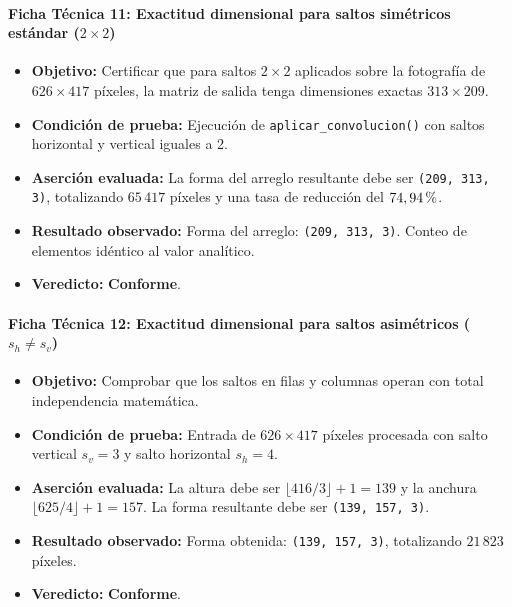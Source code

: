 \documentclass[11pt]{article}
\newcommand{\pct}{\ensuremath{\mathrm{\char37}}}
\newcommand{\pruebaok}{\textcolor{verdeExito}{\textbf{Conforme}}}
\begin{document}
\paragraph{Ficha Técnica 11: Exactitud dimensional para saltos simétricos estándar ($2\times2$)}
\begin{itemize}[itemsep=0.15em]
\item \textbf{Objetivo:} Certificar que para saltos $2\times2$ aplicados sobre la fotografía de $626 \times 417$ píxeles, la matriz de salida tenga dimensiones exactas $313 \times 209$.
\item \textbf{Condición de prueba:} Ejecución de \texttt{aplicar\_convolucion()} con saltos horizontal y vertical iguales a 2.
\item \textbf{Aserción evaluada:} La forma del arreglo resultante debe ser \texttt{(209, 313, 3)}, totalizando $65\,417$ píxeles y una tasa de reducción del $74,94\,\pct$.
\item \textbf{Resultado observado:} Forma del arreglo: \texttt{(209, 313, 3)}. Conteo de elementos idéntico al valor analítico.
\item \textbf{Veredicto:} \pruebaok.
\end{itemize}

\paragraph{Ficha Técnica 12: Exactitud dimensional para saltos asimétricos ($s_h \ne s_v$)}
\begin{itemize}[itemsep=0.15em]
\item \textbf{Objetivo:} Comprobar que los saltos en filas y columnas operan con total independencia matemática.
\item \textbf{Condición de prueba:} Entrada de $626 \times 417$ píxeles procesada con salto vertical $s_v = 3$ y salto horizontal $s_h = 4$.
\item \textbf{Aserción evaluada:} La altura debe ser $\lfloor 416/3 \rfloor + 1 = 139$ y la anchura $\lfloor 625/4 \rfloor + 1 = 157$. La forma resultante debe ser \texttt{(139, 157, 3)}.
\item \textbf{Resultado observado:} Forma obtenida: \texttt{(139, 157, 3)}, totalizando $21\,823$ píxeles.
\item \textbf{Veredicto:} \pruebaok.
\end{itemize}
\end{document}
